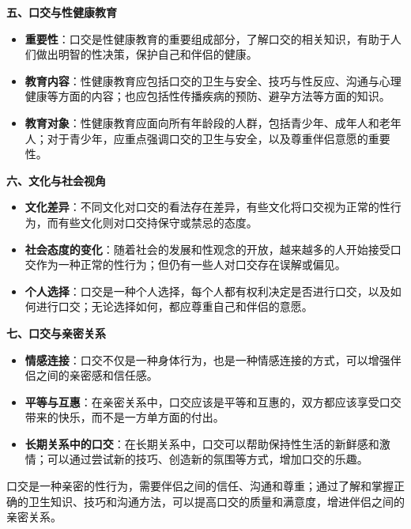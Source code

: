 \documentclass[12pt,UTF8]{ctexbook}
\begin{document}
  \textbf{五、口交与性健康教育}
  \begin{itemize}
  \item \textbf{重要性}：口交是性健康教育的重要组成部分，了解口交的相关知识，有助于人们做出明智的性决策，保护自己和伴侣的健康。
  \item \textbf{教育内容}：性健康教育应包括口交的卫生与安全、技巧与性反应、沟通与心理健康等方面的内容；也应包括性传播疾病的预防、避孕方法等方面的知识。
  \item \textbf{教育对象}：性健康教育应面向所有年龄段的人群，包括青少年、成年人和老年人；对于青少年，应重点强调口交的卫生与安全，以及尊重伴侣意愿的重要性。
  \end{itemize}

  \textbf{六、文化与社会视角}
  \begin{itemize}
  \item \textbf{文化差异}：不同文化对口交的看法存在差异，有些文化将口交视为正常的性行为，而有些文化则对口交持保守或禁忌的态度。
  \item \textbf{社会态度的变化}：随着社会的发展和性观念的开放，越来越多的人开始接受口交作为一种正常的性行为；但仍有一些人对口交存在误解或偏见。
  \item \textbf{个人选择}：口交是一种个人选择，每个人都有权利决定是否进行口交，以及如何进行口交；无论选择如何，都应尊重自己和伴侣的意愿。
  \end{itemize}

  \textbf{七、口交与亲密关系}
  \begin{itemize}
  \item \textbf{情感连接}：口交不仅是一种身体行为，也是一种情感连接的方式，可以增强伴侣之间的亲密感和信任感。
  \item \textbf{平等与互惠}：在亲密关系中，口交应该是平等和互惠的，双方都应该享受口交带来的快乐，而不是一方单方面的付出。
  \item \textbf{长期关系中的口交}：在长期关系中，口交可以帮助保持性生活的新鲜感和激情；可以通过尝试新的技巧、创造新的氛围等方式，增加口交的乐趣。
  \end{itemize}

口交是一种亲密的性行为，需要伴侣之间的信任、沟通和尊重；通过了解和掌握正确的卫生知识、技巧和沟通方法，可以提高口交的质量和满意度，增进伴侣之间的亲密关系。
\end{document}
